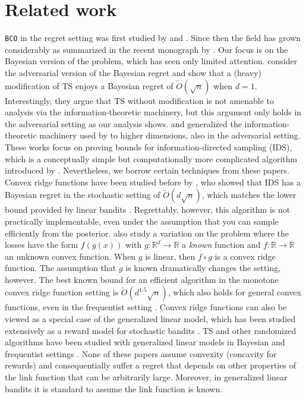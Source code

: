 \documentclass[letter, 12pt]{report}
\newcommand{\R}{\mathbb R}
\newcommand{\1}{\mathbf{1}}
\newcommand{\bco}{\texttt{BCO}\xspace}
\newcommand{\ts}{\textsc{TS}\xspace}
\newcommand{\IDS}{\textsc{IDS}}
\theoremstyle{plain}
\theoremstyle{definition}
\theoremstyle{remark}
\begin{document}
\chapter{Related work}
\bco in the regret setting was first studied by \cite{FK05} and \cite{Kle04}. Since then the field has grown considerably as summarized
in the recent monograph by \cite{lat24book}.
Our focus is on the Bayesian version of the problem, which has seen only limited attention. \cite{BDKP15} consider the adversarial version of the Bayesian
regret and show that a (heavy) modification of \ts enjoys a Bayesian regret of $\tilde O(\sqrt{n})$ when $d = 1$.
Interestingly, they argue that \ts without modification is not amenable to analysis via the information-theoretic machinery,
but this argument only holds in the adversarial setting as our analysis shows.
\cite{BE18} and \cite{Lat20-cvx} generalized the information-theoretic machinery used by \cite{BDKP15} to higher dimensions, also in the adversarial setting.
These works focus on proving bounds for information-directed sampling (\IDS{}), which is a conceptually simple but computationally more complicated algorithm
introduced by \cite{RV14}.
Nevertheless, we borrow certain techniques from these papers.
Convex ridge functions have been studied before by
\cite{lattimore2021minimax}, who showed that \IDS{} has a Bayesian regret in the stochastic setting of $\tilde O(d \sqrt{n})$,
which matches the lower bound provided by linear bandits
\citep{DHK08}. Regrettably, however, this algorithm is not practically implementable, even under the assumption that you can sample efficiently from
the posterior.
\cite{SNNJ21} also study a variation on the problem where the losses have the form $f(g(x))$ with $g : \R^d \to \R$ a \textit{known} function
and $f : \R \to \R$ an unknown convex function.
When $g$ is linear, then $f \circ g$ is a convex ridge function. The assumption that $g$ is known dramatically changes the setting, however.
The best known bound for an efficient algorithm in the monotone convex ridge function setting
is $\tilde O(d^{1.5} \sqrt{n})$, which also holds for general convex functions, even in the frequentist setting \citep{LFMV24}.
Convex ridge functions can also be viewed as a special case of the generalized linear model, which has been studied extensively
as a reward model for stochastic bandits \citep[and many more]{FiOlGaSze10}.
\ts{} and other randomized algorithms have been studied with generalized linear models in Bayesian and frequentist settings \citep{AL17,dong2019performance,kveton2020randomized}.
None of these papers assume convexity (concavity for rewards) and consequentially suffer a regret that depends on other properties of the link function
that can be arbitrarily large. Moreover, in generalized linear bandits it is standard to assume the link function is known.
\end{document}
